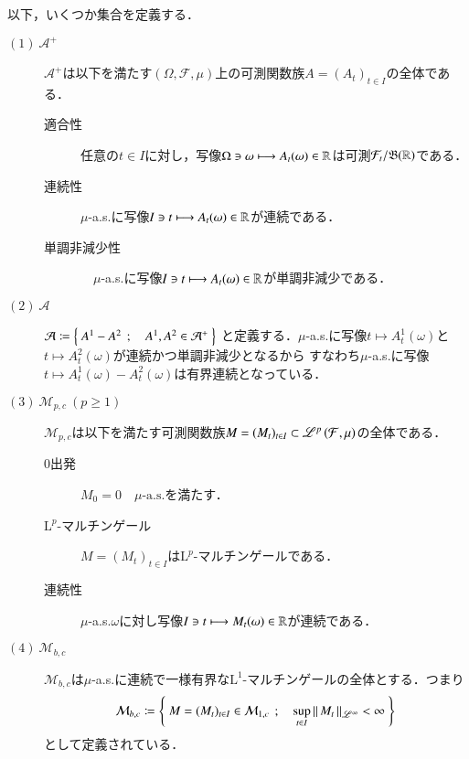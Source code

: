 	以下，いくつか集合を定義する．
	\begin{description}
		\item[$\mathrm{(1)}\ \mathcal{A}^+$] 
			$\mathcal{A}^+$は以下を満たす$(\Omega,\mathcal{F},\mu)$上の可測関数族$A = (A_t)_{t \in I}$の全体である．
			\begin{description}
				\item[適合性] 任意の$t \in I$に対し，写像$\Omega \ni \omega \longmapsto A_t(\omega) \in \mathbb{R}$は可測$\mathcal{F}_t/\mathfrak{B}(\mathbb{R})$である．
				\item[連続性] $\mu$-a.s.に写像$I \ni t \longmapsto A_t(\omega) \in \mathbb{R}$が連続である．
				\item[単調非減少性]　$\mu$-a.s.に写像$I \ni t \longmapsto A_t(\omega) \in \mathbb{R}$が単調非減少である．
			\end{description}
		
		\item[$\mathrm{(2)}\ \mathcal{A}$]
			$\mathcal{A} \coloneqq \left\{\ A^1 - A^2\ \, ; \quad A^1,A^2 \in \mathcal{A}^+\ \right\}$
			と定義する．$\mu$-a.s.に写像$t \longmapsto A^1_t(\omega)$と$t \longmapsto A^2_t(\omega)$が連続かつ単調非減少となるから
			すなわち$\mu$-a.s.に写像$t \longmapsto A^1_t(\omega) - A^2_t(\omega)$は有界連続となっている．
			
		\item[$\mathrm{(3)}\ \mathcal{M}_{p,c}\ (p \geq 1)$]
			$\mathcal{M}_{p,c}$は以下を満たす可測関数族$M = (M_t)_{t \in I} \subset \mathscr{L}^{p} \left(\mathcal{F},\mu\right)$の全体である．
			\begin{description}
				\item[0出発] $M_0 = 0 \quad \mbox{$\mu$-a.s.}$を満たす．
				\item[$\mathrm{L}^p$-マルチンゲール] $M = (M_t)_{t \in I}$は$\mathrm{L}^p$-マルチンゲールである．
				\item[連続性] $\mu$-a.s.$\omega$に対し写像$I \ni t \longmapsto M_t(\omega) \in \mathbb{R}$が連続である．
			\end{description}
		
		\item[$\mathrm{(4)}\ \mathcal{M}_{b,c}$]
			$\mathcal{M}_{b,c}$は$\mu$-a.s.に連続で一様有界な$\mathrm{L}^1$-マルチンゲールの全体とする．つまり
			\begin{align}
				\mathcal{M}_{b,c} \coloneqq \left\{\ M = (M_t)_{t \in I} \in \mathcal{M}_{1,c}\ \, ; \quad \operatorname*{sup}_{t \in I} \left\|\, M_t\, \right\|_{\mathscr{L}^\infty} < \infty\ \right\}
			\end{align}
			として定義されている．
			

\end{description}
